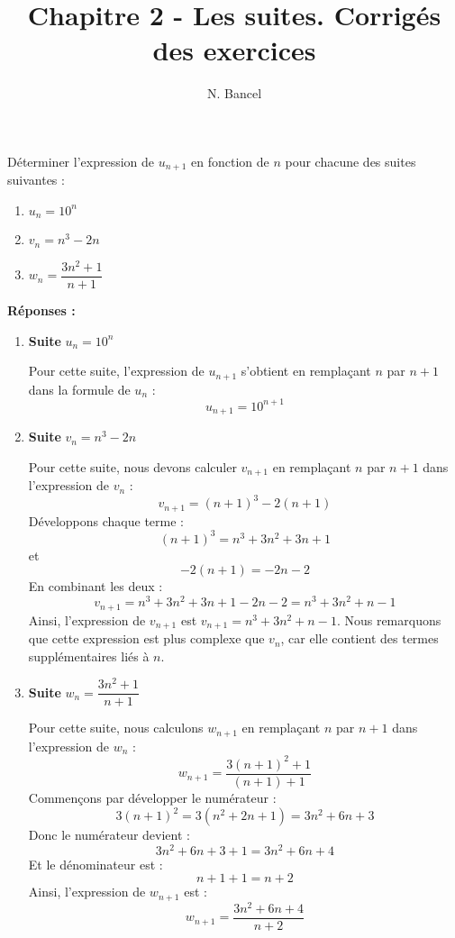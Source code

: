 \documentclass[a4paper,12pt]{article}
\begin{document}
\title{Chapitre 2 - Les suites. Corrigés des exercices}
\author{N. Bancel}

\maketitle

\begin{tcolorbox}[colback=gray!10, colframe=gray!50, title=Exercice 19 page 122]
\noindent Déterminer l'expression de $u_{n+1}$ en fonction de $n$ pour chacune des suites suivantes :
\begin{enumerate}
    \item $u_n = 10^n$
    \item $v_n = n^3 - 2n$
    \item $w_n = \dfrac{3n^2 + 1}{n + 1}$
\end{enumerate}
\end{tcolorbox}

\bigskip

\textbf{Réponses :}

\begin{enumerate}
    \item \textbf{Suite} $u_n = 10^n$
    
    Pour cette suite, l'expression de $u_{n+1}$ s'obtient en remplaçant $n$ par $n+1$ dans la formule de $u_n$ :
    \[
    u_{n+1} = 10^{n+1}
    \]
  
    \item \textbf{Suite} $v_n = n^3 - 2n$
    
    Pour cette suite, nous devons calculer $v_{n+1}$ en remplaçant $n$ par $n+1$ dans l'expression de $v_n$ :
    \[
    v_{n+1} = (n+1)^3 - 2(n+1)
    \]
    Développons chaque terme :
    \[
    (n+1)^3 = n^3 + 3n^2 + 3n + 1
    \]
    et 
    \[
    -2(n+1) = -2n - 2
    \]
    En combinant les deux :
    \[
    v_{n+1} = n^3 + 3n^2 + 3n + 1 - 2n - 2 = n^3 + 3n^2 + n - 1
    \]
    Ainsi, l'expression de $v_{n+1}$ est $v_{n+1} = n^3 + 3n^2 + n - 1$. Nous remarquons que cette expression est plus complexe que $v_n$, car elle contient des termes supplémentaires liés à $n$.

    \item \textbf{Suite} $w_n = \dfrac{3n^2 + 1}{n + 1}$
    
    Pour cette suite, nous calculons $w_{n+1}$ en remplaçant $n$ par $n+1$ dans l'expression de $w_n$ :
    \[
    w_{n+1} = \dfrac{3(n+1)^2 + 1}{(n+1) + 1}
    \]
    Commençons par développer le numérateur :
    \[
    3(n+1)^2 = 3(n^2 + 2n + 1) = 3n^2 + 6n + 3
    \]
    Donc le numérateur devient :
    \[
    3n^2 + 6n + 3 + 1 = 3n^2 + 6n + 4
    \]
    Et le dénominateur est :
    \[
    n+1+1 = n+2
    \]
    Ainsi, l'expression de $w_{n+1}$ est :
    \[
    w_{n+1} = \dfrac{3n^2 + 6n + 4}{n + 2}
    \]
    
\end{enumerate}
\end{document}
